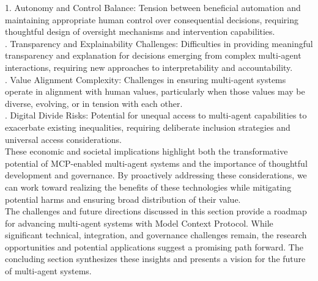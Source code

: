 1. Autonomy and Control Balance: Tension between beneficial automation and maintaining appropriate human control over consequential decisions, requiring thoughtful design of oversight mechanisms and intervention capabilities.\\ . Transparency and Explainability Challenges: Difficulties in providing meaningful transparency and explanation for decisions emerging from complex multi-agent interactions, requiring new approaches to interpretability and accountability.\\ . Value Alignment Complexity: Challenges in ensuring multi-agent systems operate in alignment with human values, particularly when those values may be diverse, evolving, or in tension with each other.\\ . Digital Divide Risks: Potential for unequal access to multi-agent capabilities to exacerbate existing inequalities, requiring deliberate inclusion strategies and universal access considerations.\\ \newline
These economic and societal implications highlight both the transformative potential of MCP-enabled multi-agent systems and the importance of thoughtful development and governance. By proactively addressing these considerations, we can work toward realizing the benefits of these technologies while mitigating potential harms and ensuring broad distribution of their value.\\ \newline
The challenges and future directions discussed in this section provide a roadmap for advancing multi-agent systems with Model Context Protocol. While significant technical, integration, and governance challenges remain, the research opportunities and potential applications suggest a promising path forward. The concluding section synthesizes these insights and presents a vision for the future of multi-agent systems.\\ \newline
